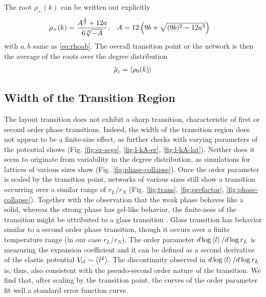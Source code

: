 \documentclass[endfloats,nofootinbib,preprint,floatfix,titlepage,superscriptaddress,linenumbers]{revtex4-1} %
\begin{document}
{The root $\rho_+(k)$ can be written out explicitly
\begin{align}
    \rho_+(k) %
    &=\frac{A^{\frac{2}{3}} + 12 a}{6 \sqrt[3]{- A}}, &
    A& = 12 \pr{9 b + \sqrt{(9b)^{2}- 12 a^{3} }}
    \label{eq:trans-rc-full}
\end{align}
with $a,b$ same as \eqref{eq:rhoab}. 
The overall transition point or the network is then the average of the roots over the degree distribution
\begin{align}
    \overline{\rho}_c = \left<\rho_0(k)\right>
\end{align}


\subsection{Width of the Transition Region \label{ap:trans-width}}
The layout transition does not exhibit a sharp transition, characteristic of first or second order phase transitions. 
Indeed, 
the width of the transition region does not appear to be a finite-size effect, as further checks with varying parameters of the potential shows (Fig. \ref{fig:er-segs}, \ref{fig:l-kA-er}, \ref{fig:l-kA-lat}). 
Neither does it seem to originate from variability in the degree distribution, as simulations for  lattices of various sizes show (Fig. \ref{fig:phase-collapse}).
Once the order parameter is scaled by the transition point, networks of various sizes still show a transition occurring over a similar range of $r_L/r_N$  (Fig. \ref{fig:trans}, \ref{fig:prefactor}, \ref{fig:phase-collapse}). 
Together with the observation that the weak phase behaves like a solid, whereas the strong phase has gel-like behavior, the finite-ness of the transition might be attributed to a glass transition \cite{gibbs1958nature}. 
Glass transition has behavior similar to a second order phase transition, though it occurs over a finite  temperature range (in our case $r_L/r_N$). 
The order parameter $d\log\left<l\right>/d\log r_L$ is measuring the expansion coefficient and it can be defined as a second derivative of the elastic potential $V_{el} \sim \left<l^2\right>$. 
The discontinuity observed in $d\log\left<l\right> /d \log r_L$ is, thus, also consistent with the pseudo-second order nature of the transition.
We find that, after scaling by the transition point, the curves of the order parameter fit well a standard error function curve. 

}
\end{document}
